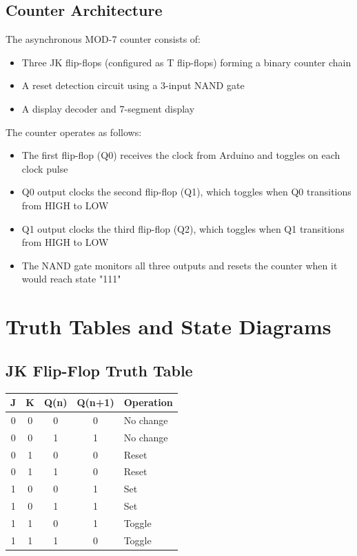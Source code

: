 \documentclass{article}
\begin{document}
\subsection{Counter Architecture}
\begin{tcolorbox}[colback=boxbg,colframe=titlebg,title=Counter Architecture,breakable]
The asynchronous MOD-7 counter consists of:

\begin{itemize}
    \item Three JK flip-flops (configured as T flip-flops) forming a binary counter chain
    \item A reset detection circuit using a 3-input NAND gate
    \item A display decoder and 7-segment display
\end{itemize}

The counter operates as follows:

\begin{itemize}
    \item The first flip-flop (Q0) receives the clock from Arduino and toggles on each clock pulse
    \item Q0 output clocks the second flip-flop (Q1), which toggles when Q0 transitions from HIGH to LOW
    \item Q1 output clocks the third flip-flop (Q2), which toggles when Q1 transitions from HIGH to LOW
    \item The NAND gate monitors all three outputs and resets the counter when it would reach state "111"
\end{itemize}
\end{tcolorbox}

\section{Truth Tables and State Diagrams}
\subsection{JK Flip-Flop Truth Table}
\begin{tcolorbox}[colback=boxbg,colframe=titlebg,title=JK Flip-Flop Truth Table,breakable]
\centering
\begin{tabular}{|c|c|c|c|l|}
\hline
J & K & Q(n) & Q(n+1) & Operation \\ \hline
0 & 0 & 0 & 0 & No change \\ \hline
0 & 0 & 1 & 1 & No change \\ \hline
0 & 1 & 0 & 0 & Reset \\ \hline
0 & 1 & 1 & 0 & Reset \\ \hline
1 & 0 & 0 & 1 & Set \\ \hline
1 & 0 & 1 & 1 & Set \\ \hline
1 & 1 & 0 & 1 & Toggle \\ \hline
1 & 1 & 1 & 0 & Toggle \\ \hline
\end{tabular}
\end{tcolorbox}
\end{document}
